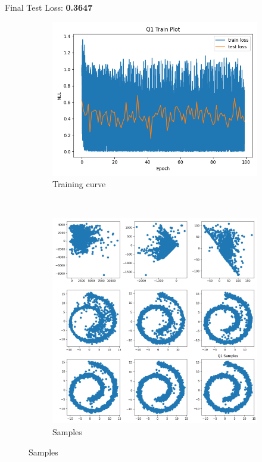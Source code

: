 \documentclass{article}
\begin{document}
Final Test Loss: \textbf{0.3647} \\
\begin{figure}[H]
    \centering
    \begin{subfigure}{0.5\textwidth}
        \centering
        \includegraphics[width=\textwidth]{figures/q1_train_plot.png}
        \caption{Training curve}
    \end{subfigure}
    \\
    \begin{subfigure}{0.5\textwidth}
        \centering
        \includegraphics[width=\textwidth]{figures/q1_samples.png}
        \caption{Samples}
    \end{subfigure}
    
\end{figure}
\end{document}
